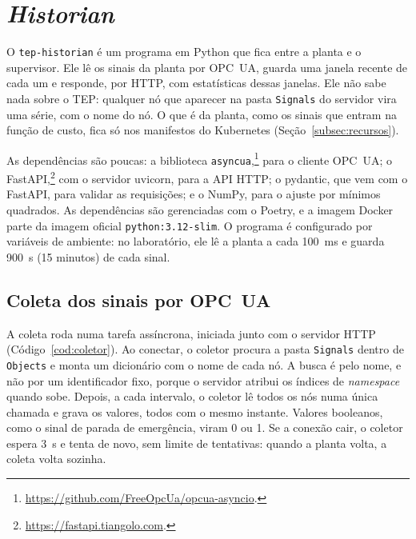 \section{\textit{Historian}}
\label{sec:historian}

O \texttt{tep-historian} é um programa em Python que fica entre a planta e o supervisor. Ele lê os sinais da planta por OPC~UA, guarda uma janela recente de cada um e responde, por HTTP, com estatísticas dessas janelas. Ele não sabe nada sobre o TEP: qualquer nó que aparecer na pasta \texttt{Signals} do servidor vira uma série, com o nome do nó. O que é da planta, como os sinais que entram na função de custo, fica só nos manifestos do Kubernetes (Seção~\ref{subsec:recursos}).

As dependências são poucas: a biblioteca \texttt{asyncua},\footnote{\url{https://github.com/FreeOpcUa/opcua-asyncio}.} para o cliente OPC~UA; o FastAPI,\footnote{\url{https://fastapi.tiangolo.com}.} com o servidor uvicorn, para a API HTTP; o pydantic, que vem com o FastAPI, para validar as requisições; e o NumPy, para o ajuste por mínimos quadrados. As dependências são gerenciadas com o Poetry, e a imagem Docker parte da imagem oficial \texttt{python:3.12-slim}. O programa é configurado por variáveis de ambiente: no laboratório, ele lê a planta a cada 100~ms e guarda 900~s (15 minutos) de cada sinal.

\subsection{Coleta dos sinais por OPC~UA}
\label{subsec:coleta}

A coleta roda numa tarefa assíncrona, iniciada junto com o servidor HTTP (Código~\ref{cod:coletor}). Ao conectar, o coletor procura a pasta \texttt{Signals} dentro de \texttt{Objects} e monta um dicionário com o nome de cada nó. A busca é pelo nome, e não por um identificador fixo, porque o servidor atribui os índices de \textit{namespace} quando sobe. Depois, a cada intervalo, o coletor lê todos os nós numa única chamada e grava os valores, todos com o mesmo instante. Valores booleanos, como o sinal de parada de emergência, viram 0 ou 1. Se a conexão cair, o coletor espera 3~s e tenta de novo, sem limite de tentativas: quando a planta volta, a coleta volta sozinha.

